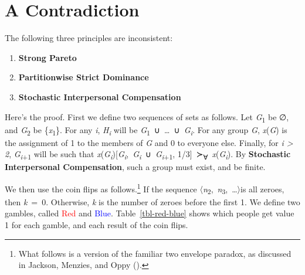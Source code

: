 \documentclass[
  11pt,
  letterpaper,
  DIV=11,
  numbers=noendperiod,
  twoside]{scrartcl}
\providecommand{\tightlist}{%
  \setlength{\itemsep}{0pt}\setlength{\parskip}{0pt}}
\begin{document}
\section{A Contradiction}\label{sec-contradiction}

The following three principles are inconsistent:

\begin{enumerate}
\def\labelenumi{\arabic{enumi}.}
\tightlist
\item
  \textbf{Strong Pareto}
\item
  \textbf{Partitionwise Strict Dominance}
\item
  \textbf{Stochastic Interpersonal Compensation}
\end{enumerate}

Here's the proof. First we define two sequences of sets as follows. Let
\emph{G}\textsubscript{1} be ∅, and \emph{G}\textsubscript{2} be
\{\emph{x}\textsubscript{1}\}. For any \emph{i},
\emph{H\textsubscript{i}} will be
\emph{G}\textsubscript{1}~∪~\ldots~∪~\emph{G\textsubscript{i}}. For any
group \emph{G}, \emph{x}(\emph{G}) is the assignment of 1 to the members
of \emph{G} and 0 to everyone else. Finally, for \emph{i \textgreater{}
2}, \emph{G}\textsubscript{\emph{i}+1} will be such that
\emph{x}(\emph{G\textsubscript{i}}){[}\emph{G\textsubscript{i}},~\emph{G\textsubscript{i}}~∪~\emph{G}\textsubscript{\emph{i}+1},
1/3{]}~≻\textsubscript{∀}~\emph{x}(\emph{G\textsubscript{i}}). By
\textbf{Stochastic Interpersonal Compensation}, such a group must exist,
and be finite.

We then use the coin flips as follows.\footnote{What follows is a
  version of the familiar two envelope paradox, as discussed in Jackson,
  Menzies, and Oppy ().} If the sequence
〈\emph{n}\textsubscript{2},~\emph{n}\textsubscript{3},~\ldots〉is all
zeroes, then \emph{k}~=~0. Otherwise, \emph{k} is the number of zeroes
before the first 1. We define two gambles, called \textcolor{red}{Red}
and \textcolor{blue}{Blue}. Table~\ref{tbl-red-blue} shows which people
get value 1 for each gamble, and each result of the coin flips.

\begin{table}

\caption{\label{tbl-red-blue}The Red-Blue choice}


\end{table}%
\end{document}
